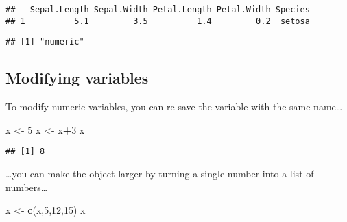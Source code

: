 \documentclass[]{article}
\newenvironment{Shaded}{\begin{snugshade}}{\end{snugshade}}
\newcommand{\KeywordTok}[1]{\textcolor[rgb]{0.13,0.29,0.53}{\textbf{#1}}}
\newcommand{\DecValTok}[1]{\textcolor[rgb]{0.00,0.00,0.81}{#1}}
\newcommand{\StringTok}[1]{\textcolor[rgb]{0.31,0.60,0.02}{#1}}
\newcommand{\CommentTok}[1]{\textcolor[rgb]{0.56,0.35,0.01}{\textit{#1}}}
\newcommand{\OperatorTok}[1]{\textcolor[rgb]{0.81,0.36,0.00}{\textbf{#1}}}
\newcommand{\NormalTok}[1]{#1}
\begin{document}
\begin{verbatim}
##   Sepal.Length Sepal.Width Petal.Length Petal.Width Species
## 1          5.1         3.5          1.4         0.2  setosa
\end{verbatim}

\begin{Shaded}
\end{Shaded}

\begin{verbatim}
## [1] "numeric"
\end{verbatim}

\subsection{Modifying variables}\label{modifying-variables}

To modify numeric variables, you can re-save the variable with the same
name\ldots{}

\begin{Shaded}
\begin{Highlighting}[]
\NormalTok{x <-}\StringTok{ }\DecValTok{5}
\NormalTok{x <-}\StringTok{ }\NormalTok{x}\OperatorTok{+}\DecValTok{3}
\NormalTok{x}
\end{Highlighting}
\end{Shaded}

\begin{verbatim}
## [1] 8
\end{verbatim}

\ldots{}you can make the object larger by turning a single number into a
list of numbers\ldots{}

\begin{Shaded}
\begin{Highlighting}[]
\NormalTok{x <-}\StringTok{ }\KeywordTok{c}\NormalTok{(x,}\DecValTok{5}\NormalTok{,}\DecValTok{12}\NormalTok{,}\DecValTok{15}\NormalTok{)}
\NormalTok{x}
\end{Highlighting}
\end{Shaded}
\end{document}
